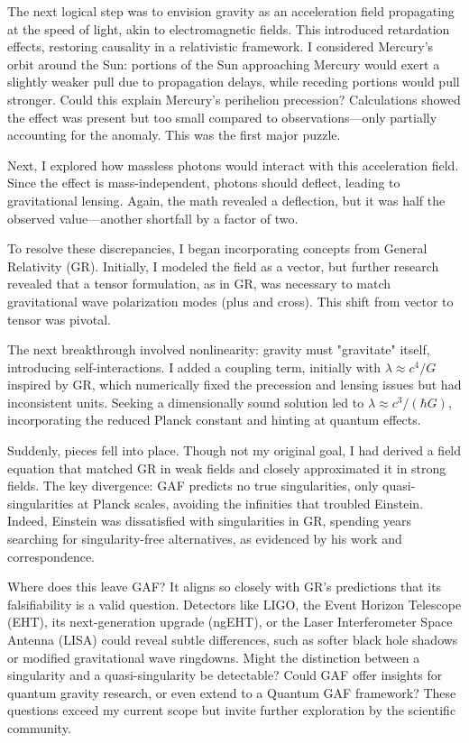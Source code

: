 \documentclass{article}
\begin{document}
The next logical step was to envision gravity as an acceleration field propagating at the speed of light, akin to electromagnetic fields. This introduced retardation effects, restoring causality in a relativistic framework. I considered Mercury's orbit around the Sun: portions of the Sun approaching Mercury would exert a slightly weaker pull due to propagation delays, while receding portions would pull stronger. Could this explain Mercury's perihelion precession? Calculations showed the effect was present but too small compared to observations—only partially accounting for the anomaly. This was the first major puzzle.

Next, I explored how massless photons would interact with this acceleration field. Since the effect is mass-independent, photons should deflect, leading to gravitational lensing. Again, the math revealed a deflection, but it was half the observed value—another shortfall by a factor of two.

To resolve these discrepancies, I began incorporating concepts from General Relativity (GR). Initially, I modeled the field as a vector, but further research revealed that a tensor formulation, as in GR, was necessary to match gravitational wave polarization modes (plus and cross). This shift from vector to tensor was pivotal.

The next breakthrough involved nonlinearity: gravity must "gravitate" itself, introducing self-interactions. I added a coupling term, initially with \( \lambda \approx c^4 / G \) inspired by GR, which numerically fixed the precession and lensing issues but had inconsistent units. Seeking a dimensionally sound solution led to \( \lambda \approx c^3 / (\hbar G) \), incorporating the reduced Planck constant and hinting at quantum effects.

Suddenly, pieces fell into place. Though not my original goal, I had derived a field equation that matched GR in weak fields and closely approximated it in strong fields. The key divergence: GAF predicts no true singularities, only quasi-singularities at Planck scales, avoiding the infinities that troubled Einstein. Indeed, Einstein was dissatisfied with singularities in GR, spending years searching for singularity-free alternatives, as evidenced by his work and correspondence.

Where does this leave GAF? It aligns so closely with GR's predictions that its falsifiability is a valid question. Detectors like LIGO, the Event Horizon Telescope (EHT), its next-generation upgrade (ngEHT), or the Laser Interferometer Space Antenna (LISA) could reveal subtle differences, such as softer black hole shadows or modified gravitational wave ringdowns. Might the distinction between a singularity and a quasi-singularity be detectable? Could GAF offer insights for quantum gravity research, or even extend to a Quantum GAF framework? These questions exceed my current scope but invite further exploration by the scientific community.
\end{document}
